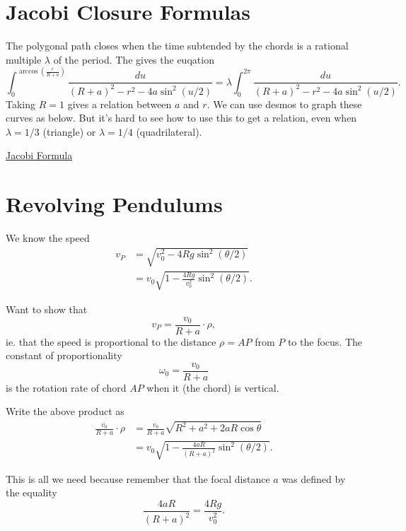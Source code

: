 \documentclass{ximera}
\begin{document}
\section*{Jacobi Closure Formulas}

The polygonal path closes when the time subtended by the chords is a rational multiple $\lambda$ of the period. The gives the euqation
\[
     \int_0^{\arccos(\frac{r}{R+a})} \frac{du}{(R+a)^2 - r^2 - 4a\sin^2(u/2)} = \lambda \int_0^{2\pi} \frac{du}{(R+a)^2 - r^2 - 4a\sin^2(u/2)} .
\]
Taking $R=1$ gives a relation between $a$ and $r$. We can use desmos to graph these curves as below. But it's hard to see how to use this to get a relation, even when $\lambda=1/3$ (triangle) or $\lambda  = 1/4$ (quadrilateral).


\begin{onlineOnly}
    \begin{center}
\end{center}
\end{onlineOnly}

\href{https://www.desmos.com/calculator/wnef0tpllt}{Jacobi Formula}



\section*{Revolving Pendulums}

We know the speed
\begin{align*}
    v_P &= \sqrt{v_0^2-4Rg \sin^2 (\theta/2)}  \\
           &=v_0 \sqrt{1-\frac{4Rg}{v_0^2} \sin^2 (\theta/2)} .
\end{align*}

Want to show that 
\[
    v_P = \frac{v_0}{R+a} \cdot \rho ,
\]
ie. that the speed is proportional to the distance $\rho = AP$ from $P$ to the focus. The constant of proportionality
\[
           \omega_0 = \frac{v_0}{R+a}
\]
is the rotation rate of chord $AP$ when it (the chord) is vertical.

Write the above product as
\begin{align*}
   \frac{v_0}{R+a} \cdot \rho  &= \frac{v_0}{R+a} \sqrt{R^2 + a^2 + 2aR \cos\theta} \\
                                         &= v_0 \sqrt{1 - \frac{4aR}{(R+a)^2} \sin^2 (\theta/2)} .
\end{align*}

This is all we need because remember that the focal distance $a$ was defined by the equality
\[
   \frac{4aR}{(R+a)^2} = \frac{4Rg}{v_0^2} .
\]
\end{document}
